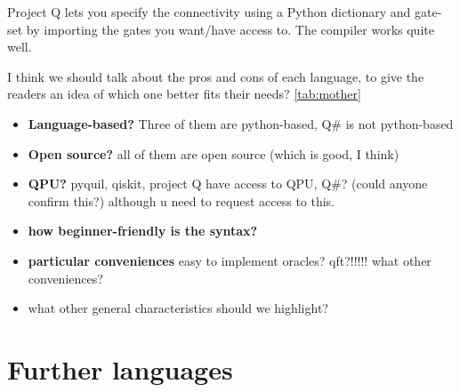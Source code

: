 Project Q lets you specify the connectivity using a Python dictionary and gate-set by importing the gates you want/have access to. The compiler works quite well.

I think we should talk about the pros and cons of each language, to give the readers an idea of which one better fits their needs? \autoref{tab:mother}
\begin{itemize}
    \item {\bf Language-based?} Three of them are python-based, Q\# is not python-based
    \item {\bf Open source?} all of them are open source (which is good, I think)
    \item {\bf QPU?} pyquil, qiskit, project Q have access to QPU, Q\#? (could anyone confirm this?) although u need to request access to this.
    \item {\bf how beginner-friendly is the syntax?}
    \item {\bf particular conveniences} easy to implement oracles? qft?!!!!! what other conveniences?
    \item what other general characteristics should we highlight?
\end{itemize}

\section{Further languages} 
\label{FurtherLanguages}

